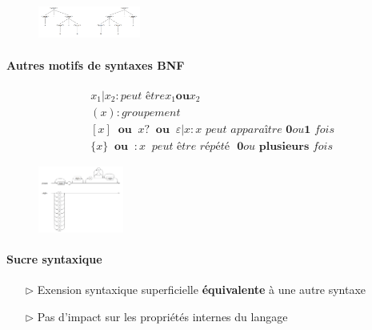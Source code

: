 \documentclass{report}
\begin{document}
\begin{multicols*}{3}
    \begin{figure}[H]
        \begin{center}
            \includegraphics[width=0.30\textwidth]{GrammaireAmbig}
        \end{center}
    \end{figure}

    \paragraph{Autres motifs de syntaxes BNF}
    \begin{align*}
        &x_1 | x_2 : \textit{peut être} x_1 \textbf{ou} x_2 \\ 
        &(x) : \textit{groupement} \\ 
        &[x] \;\; \textbf{ou} \;\; x? \;\; \textbf{ou} \;\; \varepsilon| x : 
        x \textit{ peut apparaître  } \textbf{0} ou \textbf{1} \textit{ fois} 
        \\
        &\{x\} \;\; \textbf{ou} \;\; : x \;\; \textit{peut être répété } \textbf{ 0} 
        \textit{ou} \textbf{ plusieurs} \textit{ fois}         
    \end{align*}

    \begin{figure}[H]
        \begin{center}
            \includegraphics[width=0.25\textwidth]{diagrammesyntaxique}
        \end{center}
    \end{figure}

    \paragraph{Sucre syntaxique}
    \begin{itemize}
        \item [$\rhd$ ] Exension syntaxique superficielle \textbf{équivalente} à 
            une autre syntaxe 
        \item [$\rhd$ ] Pas d'impact sur les propriétés internes du langage
    \end{itemize}


\end{multicols*}
\end{document}
